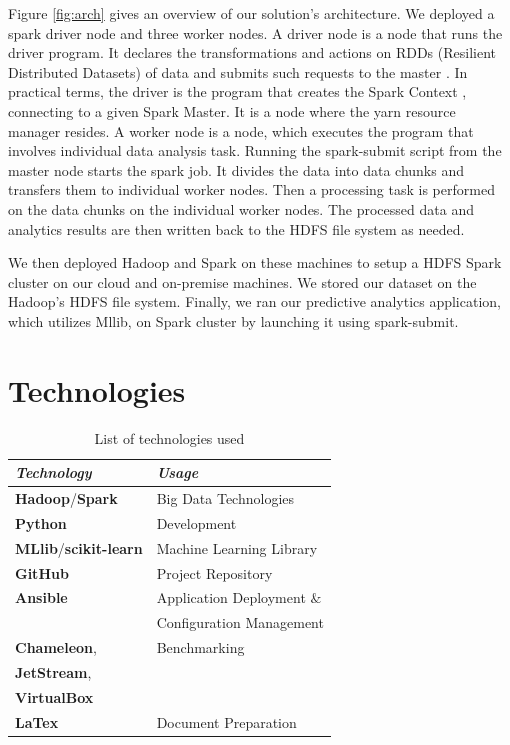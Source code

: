 \documentclass[9pt,twocolumn,twoside]{styles/osajnl}
\begin{document}
Figure \ref{fig:arch} gives an overview of our solution’s architecture. We deployed a spark driver node and three worker nodes. A driver node is a node that runs the driver program. It declares the transformations and actions on RDDs (Resilient Distributed Datasets) of data and submits such requests to the master \cite{www-rdd}. In practical terms, the driver is the program that creates the Spark Context \cite{www-sparkcontext}, connecting to a given Spark Master. It is a node where the yarn resource manager resides. A worker node is a node, which executes the program that involves individual data analysis task.
Running the spark-submit script from the master node starts the spark job. It divides the data into data chunks and transfers them to individual worker nodes. Then a processing task is performed on the data chunks on the individual worker nodes. The processed data and analytics results are then written back to the HDFS file system as needed.

We then deployed Hadoop and Spark on these machines to setup a HDFS Spark cluster on our cloud and on-premise machines. We stored our dataset on the Hadoop’s HDFS file system. Finally, we ran our predictive analytics application, which utilizes Mllib, on Spark cluster by launching it using spark-submit.

\section{Technologies}
\begin{table}[h!]
\centering
 \caption{List of technologies used}
 \begin{tabular}[width=\linewidth]{|l l|}
 \hline
 \textit{Technology} & \textit{Usage}  \\  \hline
 \hline 
 \textbf{Hadoop}\cite{www-hadoop}/\textbf{Spark} \cite{www-spark} & Big Data Technologies  \\
 \hline
 \textbf{Python}\cite{www-python} & Development \\
  \hline
 \textbf{MLlib}\cite{www-mllib}/\textbf{scikit-learn}\cite{www-sklearn} & Machine Learning Library \\
 \hline
 \textbf{GitHub}\cite{www-github} & Project Repository \\
 \hline
 \textbf{Ansible}\cite{www-ansible} & Application Deployment $\&$\\ & Configuration Management \\
 \hline
 \textbf{Chameleon}\cite{www-chameleon}, & Benchmarking \\
 \textbf{JetStream}\cite{www-jetstream}, & \\
 \textbf{VirtualBox}\cite{www-vm} &\\
 \hline
 \textbf{LaTex} \cite{www-latex} & Document Preparation \\
 \hline
\end{tabular}
\label{table:techlist}
\end{table}
\end{document}
